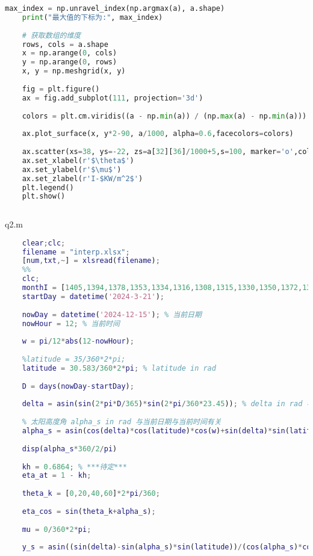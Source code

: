 \documentclass[withoutpreface,bwprint]{cumcmthesis} %
\begin{document}
\begin{appendices}
\begin{lstlisting}[language=python]
	max_index = np.unravel_index(np.argmax(a), a.shape)
	print("最大值的下标为:", max_index)
	
	# 获取数组的维度
	rows, cols = a.shape
	x = np.arange(0, cols)
	y = np.arange(0, rows)
	x, y = np.meshgrid(x, y)
	
	fig = plt.figure()
	ax = fig.add_subplot(111, projection='3d')
	
	colors = plt.cm.viridis((a - np.min(a)) / (np.max(a) - np.min(a)))
	
	ax.plot_surface(x, y*2-90, a/1000, alpha=0.6,facecolors=colors)
	
	ax.scatter(xs=38, ys=-22, zs=a[32][36]/1000+5,s=100, marker='o',color='red', label='max:(32,-18,'+str(int(a[32][36]/1000))+')')
	ax.set_xlabel(r'$\theta$')
	ax.set_ylabel(r'$\mu$')
	ax.set_zlabel(r'I-$KW/m^2$')
	plt.legend()
	plt.show()
	
\end{lstlisting}

q2.m
\begin{lstlisting}[language=matlab]
	%%
	clear;clc;
	filename = "interp.xlsx";
	[num,txt,~] = xlsread(filename);
	%%
	clc;
	monthI = [1405,1394,1378,1353,1334,1316,1308,1315,1330,1350,1372,1392];
	startDay = datetime('2024-3-21');
	
	nowDay = datetime('2024-12-15'); % 当前日期
	nowHour = 12; % 当前时间
	
	w = pi/12*abs(12-nowHour);
	
	%latitude = 35/360*2*pi;
	latitude = 30.583/360*2*pi; % latitude in rad
	
	D = days(nowDay-startDay);
	
	delta = asin(sin(2*pi*D/365)*sin(2*pi/360*23.45)); % delta in rad 与当前日期有关
	
	% 太阳高度角 alpha_s in rad 与当前日期与当前时间有关
	alpha_s = asin(cos(delta)*cos(latitude)*cos(w)+sin(delta)*sin(latitude)); 
	
	disp(alpha_s*360/2/pi)
	
	kh = 0.6864; % ***待定***
	eta_at = 1 - kh; 
	
	theta_k = [0,20,40,60]*2*pi/360;
	
	eta_cos = sin(theta_k+alpha_s);
	
	mu = 0/360*2*pi;
	
	y_s = asin((sin(delta)-sin(alpha_s)*sin(latitude))/(cos(alpha_s)*cos(latitude)));
	

\end{lstlisting}
\end{appendices}
\end{document}
